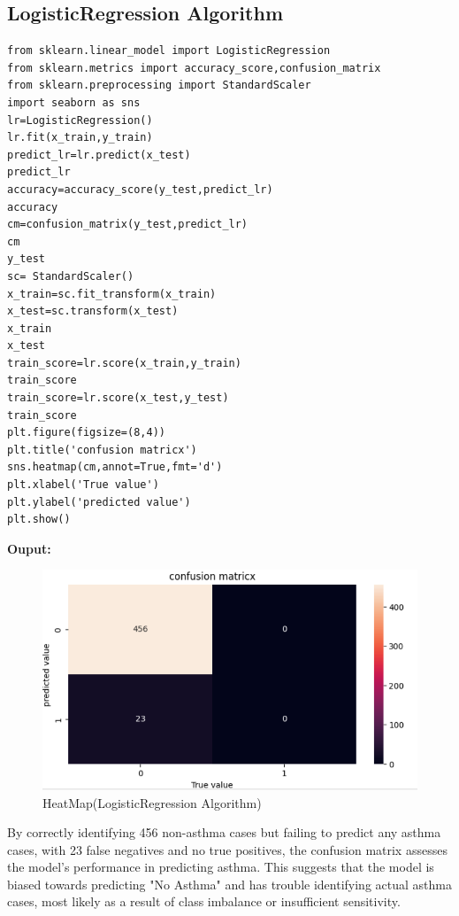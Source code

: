\subsection{LogisticRegression Algorithm}
\begin{verbatim}
from sklearn.linear_model import LogisticRegression
from sklearn.metrics import accuracy_score,confusion_matrix
from sklearn.preprocessing import StandardScaler
import seaborn as sns
lr=LogisticRegression()
lr.fit(x_train,y_train)
predict_lr=lr.predict(x_test)
predict_lr
accuracy=accuracy_score(y_test,predict_lr)
accuracy
cm=confusion_matrix(y_test,predict_lr)
cm
y_test
sc= StandardScaler()
x_train=sc.fit_transform(x_train)
x_test=sc.transform(x_test)
x_train
x_test
train_score=lr.score(x_train,y_train)
train_score
train_score=lr.score(x_test,y_test)
train_score
plt.figure(figsize=(8,4))
plt.title('confusion matricx')
sns.heatmap(cm,annot=True,fmt='d')
plt.xlabel('True value')
plt.ylabel('predicted value')
plt.show()
\end{verbatim}
\textbf{Ouput:}
\begin{figure}[h]
\centering
\includegraphics[width=0.7\linewidth]{Images/r1.png}
\caption{HeatMap(LogisticRegression Algorithm)}
\label{fig:enter-label}
\end{figure}
By correctly identifying 456 non-asthma cases but failing to predict any asthma cases, with 23 false negatives and no true positives, the confusion matrix assesses the model's performance in predicting asthma. This suggests that the model is biased towards predicting "No Asthma" and has trouble identifying actual asthma cases, most likely as a result of class imbalance or insufficient sensitivity.


